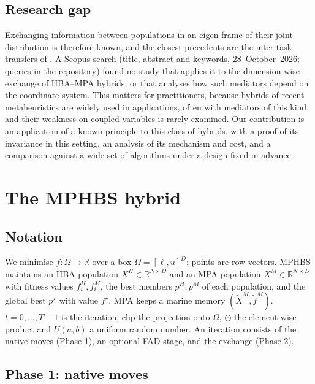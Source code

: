 \documentclass[preprint,12pt,authoryear]{elsarticle}
\theoremstyle{remark}
\begin{document}
\subsection{Research gap}
Exchanging information between populations in an eigen frame of their joint distribution is therefore known, and the
closest precedents are the inter-task transfers of \citet{tang2021regularized,tang2022adaptive}. A Scopus search
(title, abstract and keywords, 28~October~2026; queries in the repository) found no study that applies it to the
dimension-wise exchange of HBA--MPA hybrids, or that analyses how such mediators depend on the coordinate system. This
matters for practitioners, because hybrids of recent metaheuristics are widely used in applications, often with
mediators of this kind, and their weakness on coupled variables is rarely examined. Our contribution is an application
of a known principle to this class of hybrids, with a proof of its invariance in this setting, an analysis of its
mechanism and cost, and a comparison against a wide set of algorithms under a design fixed in advance.

\section{The MPHBS hybrid}
\label{sec:mphbs}

\subsection{Notation}
We minimise $f:\Omega\to\mathbb{R}$ over a box $\Omega=[\ell,u]^D$; points are row vectors. MPHBS maintains an HBA
population $X^H\in\mathbb{R}^{N\times D}$ and an MPA population $X^M\in\mathbb{R}^{N\times D}$ with fitness values
$f^H_i,f^M_i$, the best members $p^H,p^M$ of each population, and the global best $p^\star$ with value $f^\star$. MPA
keeps a marine memory $(\tilde X^M,\tilde f^M)$. $t=0,\dots,T-1$ is the iteration, $\mathrm{clip}$ the projection onto
$\Omega$, $\odot$ the element-wise product and $U(a,b)$ a uniform random number. An iteration consists of the native
moves (Phase 1), an optional FAD stage, and the exchange (Phase 2).

\subsection{Phase 1: native moves}
\end{document}
